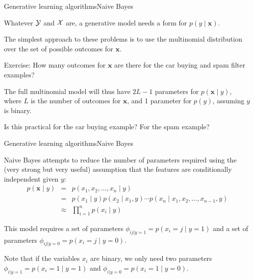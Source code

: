 \documentclass{beamer}
\renewcommand{\vec}[1]{\boldsymbol{#1}}
\begin{document}
\begin{frame}{Generative learning algorithms}{Naive Bayes}

  Whatever $\cal Y$ and $\cal X$ are, a generative model
  needs a form for
  $p( y \mid \vec{x} )$.

  \medskip
  
  The simplest approach to these problems is to use the \alert{multinomial}
  distribution over the set of possible outcomes for $\vec{x}$.

  \medskip

  Exercise: How many outcomes for $\vec{x}$ are there for the car
  buying and spam filter examples?

  \medskip

  The full multinomial model will thus have $2L -1$ parameters
  for $p(\vec{x} \mid y)$, where $L$ is the number of outcomes for
  $\vec{x}$, and 1 parameter for $p(y)$, assuming $y$ is binary.

  \medskip

  Is this practical for the car buying example? For the spam example?

\end{frame}


\begin{frame}{Generative learning algorithms}{Naive Bayes}

  Naive Bayes attempts to reduce the number of parameters required
  using the (very strong but very useful) assumption that \alert{the
    features are conditionally independent given $y$}:
  \begin{eqnarray}
    p(\vec{x} \mid y) & = & p(x_1, x_2, \ldots, x_n \mid y) \nonumber \\
    & = & p(x_1 \mid y) p(x_2 \mid x_1, y) \cdots
    p(x_n \mid x_1, x_2, \ldots, x_{n-1}, y) \nonumber \\
    & \approx & \prod_{i=1}^n p(x_i \mid y) \nonumber
  \end{eqnarray}

  This model requires a set of parameters
  $\phi_{ij|y=1} = p(x_i = j \mid y = 1)$ and a set of parameters
  $\phi_{ij|y=0} = p(x_i = j \mid y = 0)$.

  \medskip

  Note that if the variables $x_i$ are binary, we only need two
  parameters $\phi_{i|y=1} = p(x_i = 1 \mid y = 1)$ and $\phi_{i|y=0}
  = p(x_i = 1 \mid y = 0)$.
  
\end{frame}
\end{document}
